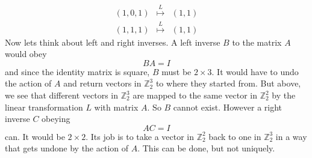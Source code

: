 {$$\begin{array}{ccc}
(1,0,1)&\stackrel{L}\mapsto&(1,1)\\
(1,1,1)&\stackrel{L}\mapsto&(1,1)
\end{array}
$$
Now lets think about left and right inverses. A left inverse $B$ to the matrix $A$
would obey
$$
BA=I
$$
and since the identity matrix is square, $B$ must be $2\times3$. It would have to undo the action of $A$ and return vectors in ${\mathbb Z}_2^3$
to where they started from. But above, we see that different vectors in ${\mathbb Z}_2^3$ are mapped to the same vector in ${\mathbb Z}_2^2$
by the linear transformation $L$ with matrix $A$. So $B$ cannot exist. However a right inverse $C$ obeying
$$
AC=I
$$
can. It would be $2\times2$. Its job is to take a vector in ${\mathbb Z}_2^2$ back to one in ${\mathbb Z}_2^3$ in a way that gets undone by the action of $A$.
This can be done, but not uniquely. 

} %


